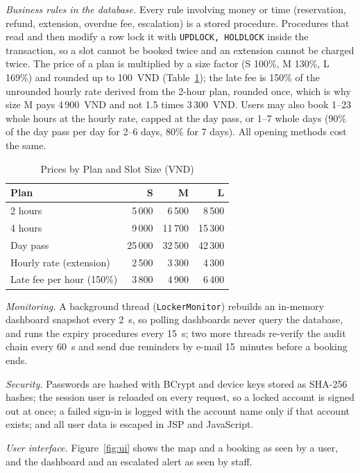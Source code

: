 \textit{Business rules in the database.} Every rule involving money or time (reservation, refund, extension,
overdue fee, escalation) is a stored procedure. Procedures that read and then modify a row lock it with
\texttt{UPDLOCK, HOLDLOCK} inside the transaction, so a slot cannot be booked twice and an extension cannot be charged
twice. The price of a plan is multiplied by a size factor (S 100\%, M 130\%, L 169\%) and rounded up to 100~VND
(Table~\ref{tab:price}); the late fee is 150\% of the unrounded hourly rate derived from the 2-hour plan, rounded once,
which is why size M pays 4\,900~VND and not 1.5 times 3\,300~VND. Users may also book 1--23 whole hours at the hourly
rate, capped at the day pass, or 1--7 whole days (90\% of the day pass per day for 2--6 days, 80\% for 7 days). All
opening methods cost the same.

\begin{table}[t]
\renewcommand{\arraystretch}{1.1}
\centering
\small
\caption{Prices by Plan and Slot Size (VND)}
\label{tab:price}
\begin{tabular}{l r r r}
\toprule
Plan & S & M & L \\
\midrule
2 hours & 5\,000 & 6\,500 & 8\,500 \\
4 hours & 9\,000 & 11\,700 & 15\,300 \\
Day pass & 25\,000 & 32\,500 & 42\,300 \\
Hourly rate (extension) & 2\,500 & 3\,300 & 4\,300 \\
Late fee per hour (150\%) & 3\,800 & 4\,900 & 6\,400 \\
\bottomrule
\end{tabular}
\end{table}

\textit{Monitoring.} A background thread (\texttt{LockerMonitor}) rebuilds an in-memory dashboard snapshot every
2~s, so polling dashboards never query the database, and runs the expiry procedures every 15~s; two more threads
re-verify the audit chain every 60~s and send due reminders by e-mail 15~minutes before a booking ends.

\textit{Security.} Passwords are hashed with BCrypt and device keys stored as SHA-256 hashes; the session user is
reloaded on every request, so a locked account is signed out at once; a failed sign-in is logged with the account name
only if that account exists; and all user data is escaped in JSP and JavaScript.

\textit{User interface.} Figure~\ref{fig:ui} shows the map and a booking as seen by a user, and the dashboard and an escalated
alert as seen by staff.

